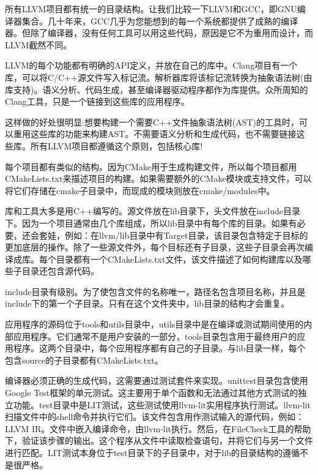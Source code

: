 所有LLVM项目都有统一的目录结构。让我们比较一下LLVM和GCC，即GNU编译器集合。几十年来，GCC几乎为您能想到的每一个系统都提供了成熟的编译器。但除了编译器，没有任何工具可以用这些代码，原因是它不为重用而设计，而LLVM截然不同。\par

LLVM的每个功能都有明确的API定义，并放在自己的库中。Clang项目有一个库，可以将C/C++源文件写入标记流。解析器库将该标记流转换为抽象语法树(由库支持)。语义分析、代码生成，甚至编译器驱动程序都作为库提供。众所周知的Clang工具，只是一个链接到这些库的应用程序。\par

这样做的好处很明显:想要构建一个需要C++文件抽象语法树(AST)的工具时，可以重用这些库的功能来构建AST。不需要语义分析和生成代码，也不需要链接这些库。所有LLVM项目都遵循这个原则，包括核心库!\par

每个项目都有类似的结构。因为CMake用于生成构建文件，所以每个项目都用CMakeLists.txt来描述项目的构建。如果需要额外的CMake模块或支持文件，可以将它们存储在cmake子目录中，而现成的模块则放在cmake/modules中。\par

库和工具大多是用C++编写的。源文件放在lib目录下，头文件放在include目录下。因为一个项目通常由几个库组成，所以lib目录中有每个库的目录。如果有必要，还会套娃，例如：在llvm/lib目录中有Target目录，该目录包含特定于目标的更加底层的操作。除了一些源文件外，每个目标还有子目录，这些子目录会再次编译成库。每个目录都有一个CMakeLists.txt文件，该文件描述了如何构建库以及哪些子目录还包含源代码。\par

include目录有级别。为了使包含文件的名称唯一，路径名包含项目名称，并且是include下的第一个子目录。只有在这个文件夹中，lib目录的结构才会重复。\par

应用程序的源码位于tools和utils目录中，utils目录中是在编译或测试期间使用的内部应用程序。它们通常不是用户安装的一部分，tools目录包含用于最终用户的应用程序。这两个目录中，每个应用程序都有自己的子目录。与lib目录一样，每个包含source的子目录都有CMakeLists.txt。\par

编译器必须正确的生成代码，这需要通过测试套件来实现。unittest目录包含使用Google Test框架的单元测试。这主要用于单个函数和无法通过其他方式测试的独立功能。test目录中是LIT测试，这些测试使用llvm-lit实用程序执行测试。llvm-lit扫描文件中的shell命令并执行它们。该文件包含用作测试输入的源代码，例如：LLVM IR。文件中嵌入编译命令，由llvm-lit执行。然后，在FileCheck工具的帮助下，验证该步骤的输出。这个程序从文件中读取检查语句，并将它们与另一个文件进行匹配。LIT测试本身位于test目录下的子目录中，对于lib的目录结构的遵循不是很严格。\par


